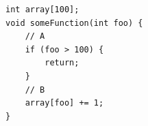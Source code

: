 \documentclass[tikz]{standalone}
\begin{document}
\begin{lrbox}{\boundsModelCode}
\begin{lstlisting}
int array[100];
void someFunction(int foo) {
    // A
    if (foo > 100) {
        return;
    }
    // B
    array[foo] += 1;
}
\end{lstlisting}
\end{lrbox}



\end{document}
